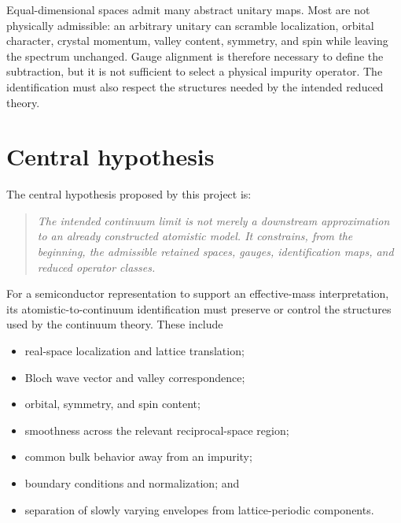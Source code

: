 Equal-dimensional spaces admit many abstract unitary maps. Most are not
physically admissible: an arbitrary unitary can scramble localization, orbital
character, crystal momentum, valley content, symmetry, and spin while leaving
the spectrum unchanged. Gauge alignment is therefore necessary to define the
subtraction, but it is not sufficient to select a physical impurity operator.
The identification must also respect the structures needed by the intended
reduced theory.

\section{Central hypothesis}

The central hypothesis proposed by this project is:
\begin{quote}
\itshape
The intended continuum limit is not merely a downstream approximation to an
already constructed atomistic model. It constrains, from the beginning, the
admissible retained spaces, gauges, identification maps, and reduced operator
classes.
\end{quote}

For a semiconductor representation to support an effective-mass
interpretation, its atomistic-to-continuum identification must preserve or
control the structures used by the continuum theory. These include
\begin{itemize}
    \item real-space localization and lattice translation;
    \item Bloch wave vector and valley correspondence;
    \item orbital, symmetry, and spin content;
    \item smoothness across the relevant reciprocal-space region;
    \item common bulk behavior away from an impurity;
    \item boundary conditions and normalization; and
    \item separation of slowly varying envelopes from lattice-periodic
          components.
\end{itemize}

